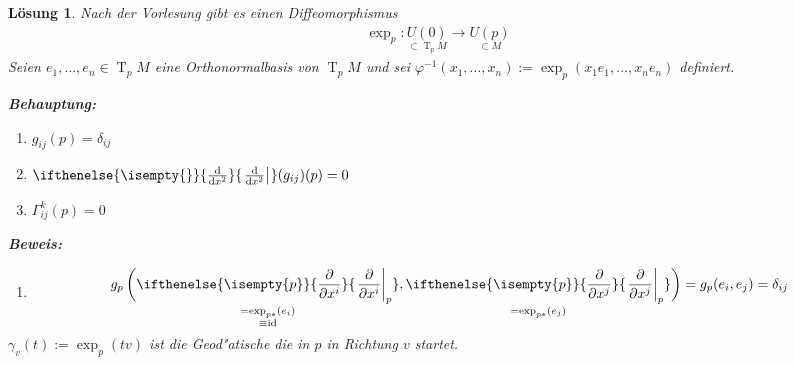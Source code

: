\documentclass[paper=A4, twoside, chapterprefix=true, bibliography=totoc, headsepline]{scrbook}
\let\temp\phi{}
\let\phi\varphi{}
\let\varphi\temp{}
\let\temp\theta{}
\let\theta\vartheta{}
\let\vartheta\temp{}
\let\temp\epsilon{}
\let\epsilon\varepsilon{}
\let\varepsilon\temp{}
\let\temp\rho{}
\let\rho\varrho{}
\let\varrho\temp{}
\DeclareMathOperator{\id}{id}       %
\DeclareMathOperator{\T}{T}         %
\newcommand{\dop}{\mathrm{d}}
\newcommand{\difffrac}[3][]{\ifthenelse{\isempty{#1}}{\frac{\dop #2}{\dop #3}}{\left. \frac{\dop #2}{\dop #3} \right|_{#1}}}
\newcommand{\pdifffrac}[3][]{\ifthenelse{\isempty{#1}}{\frac{\partial #2}{\partial #3}}{\left. \frac{\partial #2}{\partial #3} \right|_{#1}}}
\theoremstyle{plain}
\theoremstyle{nonumberplain}
\theoremstyle{empty}
\theoremstyle{break}
\newtheorem{Loes}{L\"osung}
\begin{document}
\begin{Loes}
Nach der Vorlesung gibt es einen Diffeomorphismus
\begin{align*}
	\exp_p: \underset{\subset \T_pM}{U(0)} \to \underset{\subset M}{U(p)}
\end{align*}
Seien $e_1,\ldots , e_n \in \T_pM$ eine Orthonormalbasis von $\T_pM$ und sei $\phi^{-1}(x_1,\ldots ,x_n) := \exp_p(x_1e_1,\ldots ,x_ne_n)$ definiert.

\textbf{Behauptung:}\begin{enumerate}[label=(\roman*)]
\item
	$g_{ij}(p) = \delta_{ij}$
\item
	$\difffrac{}{x^2}(g_{ij})(p) = 0$
\item
	$\Gamma_{ij}^k(p) = 0$
\end{enumerate}
\textbf{Beweis:}\begin{enumerate}[label=(\roman*),leftmargin=*,widest=iii]
\item
	\begin{align*}
		g_p \left( \smash{ \underset{\substack{=\exp_{p*}(e_i) \\ \equiv \id}}{\pdifffrac[p]{}{x^{i}}}, \underset{= \exp_{p*}(e_j)}{\pdifffrac[p]{}{x^{j}}} } \vphantom{\pdifffrac{}{}} \right) = g_p(e_i, e_j) = \delta_{ij} \vphantom{\underset{\substack{a\\a}}{\pdifffrac{}{}}}
	\end{align*}
\end{enumerate}
$\gamma_v(t) := \exp_p(tv)$ ist die Geod"atische die in $p$ in Richtung $v$ startet.


\end{Loes}
\end{document}

